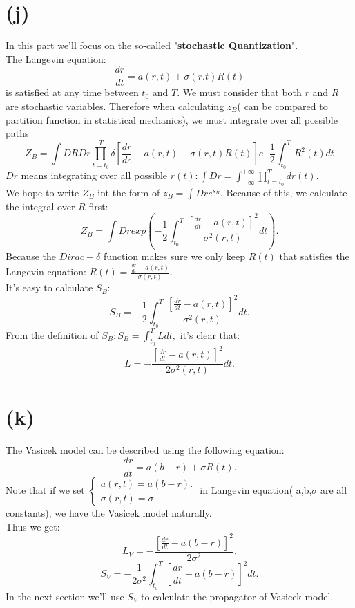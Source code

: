 \documentclass[12pt,a4paper]{paper}
\begin{document}
\section{(j)}
In this part we'll focus on the so-called "\textbf{stochastic Quantization}".\\
\indent The Langevin equation:
\begin{equation}
\frac{dr}{dt}=a(r,t)+\sigma (r.t)R(t)
\end{equation}
is satisfied at any time between $t_{0}$ and $T$. We must consider that both $r$ and $R$ are stochastic variables. Therefore when calculating $z_{B}$( can be compared to partition function in statistical mechanics), we must integrate over all possible paths
\begin{equation}
Z_{B}=\int DRDr\prod_{t=t_{0}}^T \delta [\frac{dr}{dc}-a(r,t)-\sigma (r,t)R(t)]e^-\frac{1}{2}\int_{t_{0}}^{T}R^2 (t)dt
\end{equation}
$Dr$ means integrating over all possible $r(t): \int Dr=\int_{-\infty}^{+\infty} \prod_{t=t_{0}}^T dr(t)$.\\
\indent We hope to write $Z_{B}$ int the form of $z_{B}=\int Dre^{s_{B}}$. Because of this, we calculate the integral over $R$ first:
\begin{equation}
Z_{B}=\int Drexp(-\frac{1}{2}\int_{t_{0}}^T \frac{[\frac{dr}{dt}-a(r,t)]^2}{\sigma^2 (r,t)}dt).
\end{equation}
\indent Because the $Dirac-\delta$ function makes sure we only keep $R(t)$ that satisfies the Langevin equation: $R(t)=\frac{\frac{dr}{dt}-a(r,t)}{\sigma (r,t)}$.\\
\indent It's easy to calculate $S_{B}$:
\begin{equation}
S_{B}=-\frac{1}{2}\int_{t_{0}}^T \frac{[\frac{dr}{dt}-a(r,t)]^2}{\sigma^2 (r,t)}dt.
\end{equation}
\indent From the definition of $S_{B}:S_{B}=\int_{t_{0}}^T Ldt,$ it's clear that:
\begin{equation}
L=-\frac{[\frac{dr}{dt}-a(r,t)]^2}{2\sigma^2 (r,t)}dt.
\end{equation}

\section{(k)}
The Vasicek model can be described using the following equation:
\begin{equation}
\frac{dr}{dt}=a(b-r)+\sigma R(t).
\end{equation}
\indent Note that if we set 
$\left\{\begin{matrix}
a(r,t)=a(b-r).\\
\sigma (r,t)=\sigma .
\end{matrix}\right.$ in Langevin equation( a,b,$\sigma$ are all constants), we have the Vasicek model naturally.\\
\indent Thus we get:
\begin{equation}
L_{V}=-\frac{[\frac{dr}{dt}-a(b-r)]^2}{2\sigma ^2}.
\end{equation}
\begin{equation}
S_{V}=-\frac{1}{2\sigma ^2}\int_{t_0}^{T}[\frac{dr}{dt}-a(b-r)]^2 dt.
\end{equation}
In the next section we'll use $S_{V}$ to calculate the propagator of Vasicek model.
\end{document}
